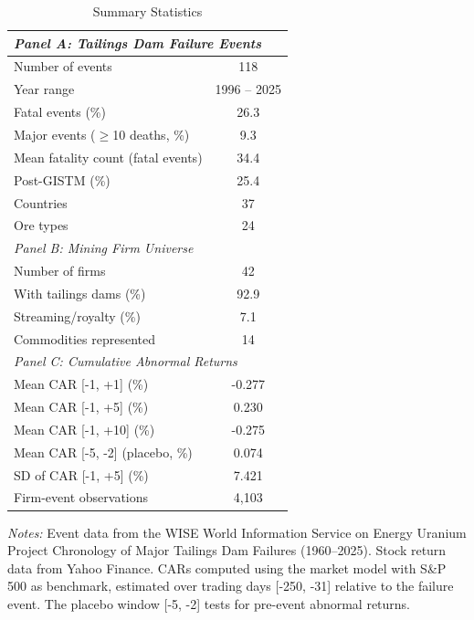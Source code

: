 \begin{table}[htbp]
\centering
\caption{Summary Statistics}
\label{tab:sumstats}
\begin{threeparttable}
\begin{tabular}{lc}
\toprule
\multicolumn{2}{l}{\textit{Panel A: Tailings Dam Failure Events}} \\
\midrule
Number of events & 118 \\
Year range & 1996 -- 2025 \\
Fatal events (\%) & 26.3 \\
Major events ($\geq$10 deaths, \%) & 9.3 \\
Mean fatality count (fatal events) & 34.4 \\
Post-GISTM (\%) & 25.4 \\
Countries & 37 \\
Ore types & 24 \\
\midrule
\multicolumn{2}{l}{\textit{Panel B: Mining Firm Universe}} \\
\midrule
Number of firms & 42 \\
With tailings dams (\%) & 92.9 \\
Streaming/royalty (\%) & 7.1 \\
Commodities represented & 14 \\
\midrule
\multicolumn{2}{l}{\textit{Panel C: Cumulative Abnormal Returns}} \\
\midrule
Mean CAR [-1, +1] (\%) & -0.277 \\
Mean CAR [-1, +5] (\%) & 0.230 \\
Mean CAR [-1, +10] (\%) & -0.275 \\
Mean CAR [-5, -2] (placebo, \%) & 0.074 \\
SD of CAR [-1, +5] (\%) & 7.421 \\
Firm-event observations & 4,103 \\
\bottomrule
\end{tabular}
\begin{tablenotes}[flushleft]
\small
\item \textit{Notes:} Event data from the WISE World Information Service on Energy Uranium Project
Chronology of Major Tailings Dam Failures (1960--2025). Stock return data from Yahoo Finance.
CARs computed using the market model with S\&P 500 as benchmark, estimated over trading
days [-250, -31] relative to the failure event. The placebo window [-5, -2] tests for
pre-event abnormal returns.
\end{tablenotes}
\end{threeparttable}
\end{table}
